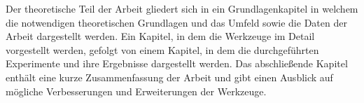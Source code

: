 	Der theoretische Teil der Arbeit gliedert sich in ein Grundlagenkapitel in welchem die notwendigen theoretischen Grundlagen und das Umfeld sowie die Daten der Arbeit dargestellt werden. Ein Kapitel, in dem die Werkzeuge im Detail vorgestellt werden, gefolgt von einem Kapitel, in dem die durchgeführten Experimente und ihre Ergebnisse dargestellt werden. Das abschließende Kapitel enthält eine kurze Zusammenfassung der Arbeit und gibt einen Ausblick auf mögliche Verbesserungen und Erweiterungen der Werkzeuge.

